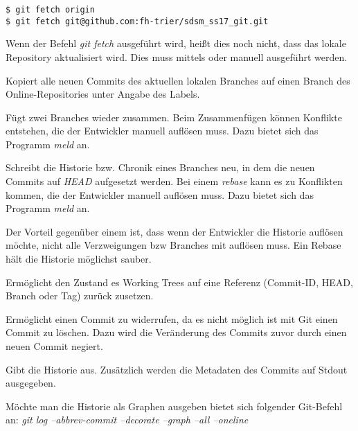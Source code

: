 \begin{verbatim}
$ git fetch origin
$ git fetch git@github.com:fh-trier/sdsm_ss17_git.git
\end{verbatim}

\begin{INFO}
  Wenn der Befehl \textit{git fetch} ausgeführt wird, heißt dies noch nicht, dass das lokale Repository aktualisiert wird. Dies muss mittels \textit{} oder \textit{} manuell ausgeführt werden.
\end{INFO}

\label{sec:git-commands.advanced.push}
Kopiert alle neuen Commits des aktuellen lokalen Branches auf einen Branch des Online-Repositories unter Angabe des Labels.

\label{sec:git-commands.advanced.merge}
Fügt zwei Branches wieder zusammen. Beim Zusammenfügen können Konflikte entstehen, die der Entwickler manuell auflösen muss. Dazu bietet sich das Programm \textit{meld} an.

\label{sec:git-commands.advanced.rebase}
Schreibt die Historie bzw. Chronik eines Branches neu, in dem die neuen Commits auf \textit{HEAD} aufgesetzt werden. Bei einem \textit{rebase} kann es zu Konflikten kommen, die der Entwickler manuell auflösen muss. Dazu bietet sich das Programm \textit{meld} an. 

Der Vorteil gegenüber einem \textit{} ist, dass wenn der Entwickler die Historie auflösen möchte, nicht alle Verzweigungen bzw Branches mit auflösen muss. Ein Rebase hält die Historie möglichst sauber.

\label{sec:git-commands.advanced.reset}
Ermöglicht den Zustand es Working Trees auf eine Referenz (Commit-ID, HEAD, Branch oder Tag) zurück zusetzen.

\label{sec:git-commands.advanced.revert}
Ermöglicht einen Commit zu widerrufen, da es nicht möglich ist mit Git einen Commit zu löschen. Dazu wird die Veränderung des Commits zuvor durch einen neuen Commit negiert.

\label{sec:git-commands.advanced.log}
Gibt die Historie aus. Zusätzlich werden die Metadaten des Commits auf Stdout ausgegeben. 

\begin{INFO}
  Möchte man die Historie als Graphen ausgeben bietet sich folgender Git-Befehl an: \textit{git log --abbrev-commit --decorate --graph --all --oneline}
\end{INFO}

